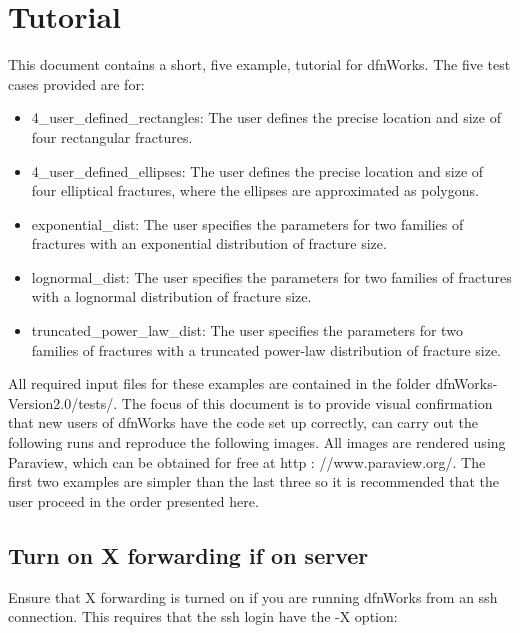 \documentclass[letterpaper,10pt,english]{sphinxmanual}
\begin{document}
\chapter{Tutorial}
\label{tutorial::doc}\label{tutorial:tutorial}
This document contains a short, five example, tutorial for dfnWorks. The five test cases provided are for:
\begin{itemize}
\item {} 
4\_user\_defined\_rectangles: The user defines the precise location and size of four rectangular fractures.

\item {} 
4\_user\_defined\_ellipses: The user defines the precise location and size of four elliptical fractures, where the ellipses are approximated as polygons.

\item {} 
exponential\_dist: The user specifies the parameters for two families of fractures with an exponential distribution of fracture size.

\item {} 
lognormal\_dist: The user specifies the parameters for two families of fractures with a lognormal distribution of fracture size.

\item {} 
truncated\_power\_law\_dist: The user specifies the parameters for two families of fractures with a truncated power-law distribution of fracture size.

\end{itemize}

All required input files for these examples are contained in the folder dfnWorks-Version2.0/tests/. The focus of this document is to provide visual confirmation that new users of dfnWorks have the code set up correctly, can carry out the following runs and reproduce the following images. All images are rendered using Paraview, which can be obtained for free at http : //www.paraview.org/. The first two examples are simpler than the last three so it is recommended that the user proceed in the order presented here.


\section{Turn on X forwarding if on server}
\label{tutorial:turn-on-x-forwarding-if-on-server}
Ensure that X forwarding is turned on if you are running dfnWorks from an ssh connection. This requires that the ssh login have the -X option:
\end{document}
